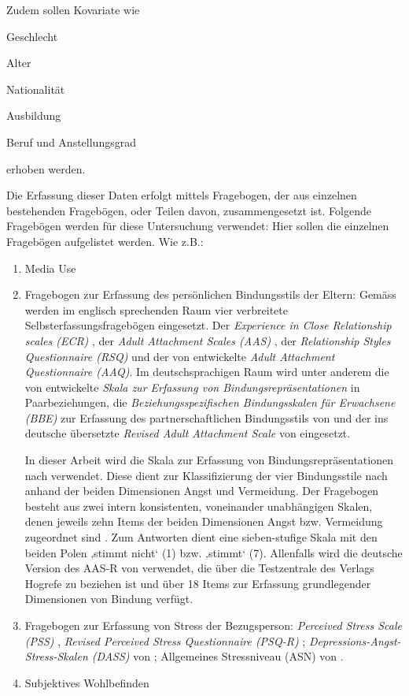Zudem sollen Kovariate wie 
\begin{seriate}
    \item Geschlecht
    \item Alter
    \item Nationalität
    \item Ausbildung
    \item Beruf und Anstellungsgrad
\end{seriate}
erhoben werden.

Die Erfassung dieser Daten erfolgt mittels Fragebogen, der aus einzelnen bestehenden Fragebögen, oder Teilen davon, zusammengesetzt ist. Folgende Fragebögen werden für diese Untersuchung verwendet:
Hier sollen die einzelnen Fragebögen aufgelistet werden. Wie z.B.:
\begin{enumerate}
    \item Media Use
    \item Fragebogen zur Erfassung des persönlichen Bindungsstils der Eltern: Gemäss  werden im englisch sprechenden Raum vier verbreitete Selbsterfassungsfragebögen eingesetzt. Der \textit{
Experience in Close Relationship scales (ECR)} \cite{Brennan1998}, der \textit{Adult Attachment Scales (AAS)} \cite{Collins1990}, der \textit{Relationship Styles Questionnaire (RSQ)} \cite{Griffin1994} und der von  entwickelte \textit{Adult Attachment Questionnaire (AAQ)}. Im deutschsprachigen Raum wird unter anderem die von  entwickelte \textit{Skala zur Erfassung von Bindungsrepräsentationen} in Paarbeziehungen, die \textit{Beziehungsspezifischen Bindungsskalen für Erwachsene (BBE)} zur Erfassung des partnerschaftlichen Bindungsstils von  und der ins deutsche übersetzte \textit{Revised Adult Attachment Scale} von  eingesetzt. 

In dieser Arbeit wird die Skala zur Erfassung von Bindungsrepräsentationen nach  verwendet. Diese dient zur Klassifizierung der vier Bindungsstile nach  anhand der beiden Dimensionen Angst und Vermeidung. Der Fragebogen besteht aus zwei intern konsistenten, voneinander unabhängigen Skalen, denen jeweils zehn Items der beiden Dimensionen Angst bzw. Vermeidung zugeordnet sind \cite{Baadte2006}. Zum Antworten dient eine sieben-stufige Skala mit den beiden Polen ‚stimmt nicht‘ (1) bzw. ‚stimmt‘ (7). Allenfalls wird die deutsche Version des AAS-R von  verwendet, die über die Testzentrale des Verlags Hogrefe zu beziehen ist und über 18 Items zur Erfassung grundlegender Dimensionen von Bindung verfügt.
    \item Fragebogen zur Erfassung von Stress der Bezugsperson:
    \textit{Perceived Stress Scale (PSS)} \cite{Cohen1983}, \textit{Revised Perceived Stress Questionnaire (PSQ-R)} \cite{Levenstein1993, Fliege2005, Cohen1983}; \textit{Depressions-Angst-Stress-Skalen (DASS)} von \cite{Nilges2015}; Allgemeines Stressniveau (ASN) von .
    \item Subjektives Wohlbefinden 
\end{enumerate}

